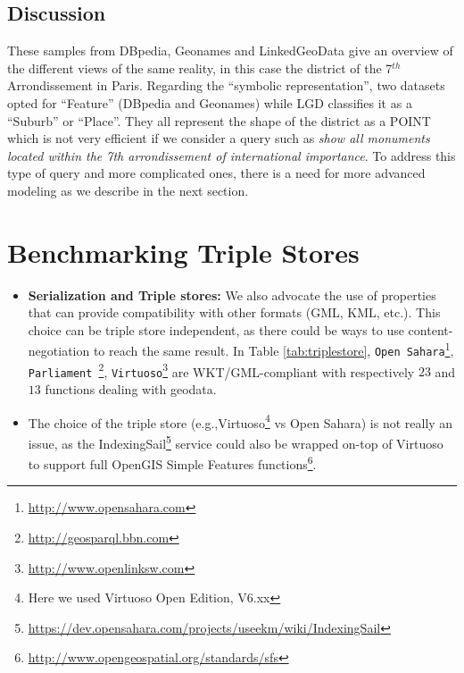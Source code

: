 \subsection{Discussion}
These samples from DBpedia, Geonames and LinkedGeoData give an overview of the different views of the same reality, in this case the district of the 7$^{th}$ Arrondissement in Paris. Regarding the ``symbolic representation'', two datasets opted for ``Feature'' (DBpedia and Geonames) while LGD classifies it as a ``Suburb'' or ``Place''. They all represent the shape of the district as a POINT which is not very efficient if we consider a query such as \emph{show all monuments located within the 7th arrondissement of international importance}. To address this type of query and more complicated ones, there is a need for more advanced modeling as we describe in the next section.

\section{Benchmarking Triple Stores}
\label{sec:benchmarking}

\begin{itemize}
\item \textbf{Serialization and Triple stores:} We also advocate the use of properties that can provide compatibility with other formats (GML, KML, etc.). This choice can be triple store independent, as there could be ways to use content-negotiation to reach the same result. In Table \ref{tab:triplestore}, \texttt{Open Sahara}\footnote{\url{http://www.opensahara.com}}, \texttt{Parliament }\footnote{\url{http://geosparql.bbn.com}},  \texttt{Virtuoso}\footnote{\url{http://www.openlinksw.com}} are WKT/GML-compliant with respectively $23$ and $13$ functions dealing with geodata.
\item The choice of the triple store (e.g.,Virtuoso\footnote{Here we used Virtuoso Open Edition, V6.xx} vs Open Sahara) is not really an issue, as the IndexingSail\footnote{\url{https://dev.opensahara.com/projects/useekm/wiki/IndexingSail}} service could also be wrapped on-top of Virtuoso to support full OpenGIS Simple Features functions\footnote{\url{http://www.opengeospatial.org/standards/sfs}}.
\end{itemize}

